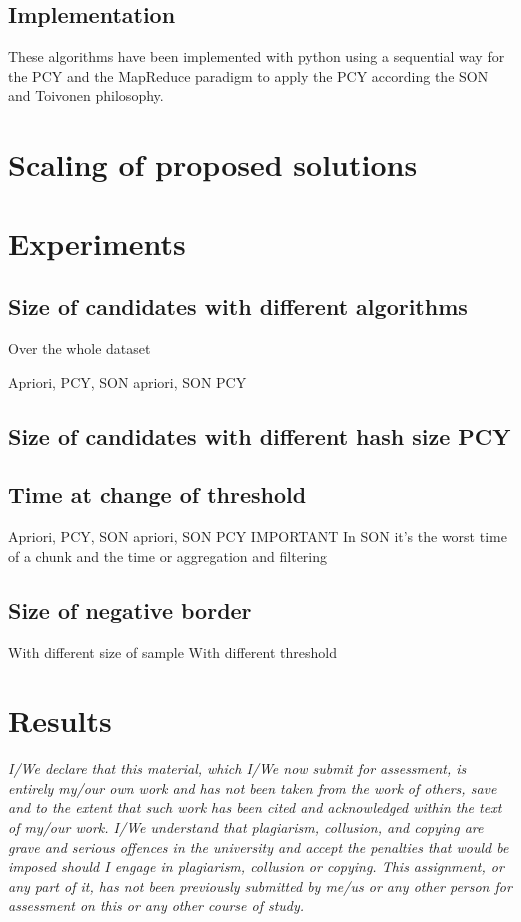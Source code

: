 \documentclass[14pt]{extarticle}
\begin{document}
\subsection{Implementation}
These algorithms have been implemented with python using a sequential way for the PCY and the MapReduce paradigm to apply the PCY according the SON and Toivonen philosophy.


\section{Scaling of proposed solutions}
\section{Experiments}
\subsection{Size of candidates with different algorithms}
Over the whole dataset

Apriori, PCY, SON apriori, SON PCY
\subsection{Size of candidates with different hash size PCY}
\subsection{Time at change of threshold}
Apriori, PCY, SON apriori, SON PCY
IMPORTANT
In SON it's the worst time of a chunk and the time or aggregation and filtering
\subsection{Size of negative border}
With different size of sample
With different threshold
\section{Results}
{\it I/We declare that this material, which I/We now submit for assessment, is entirely my/our own work and has not been taken from the work of others, save and to the extent that such work has been cited and acknowledged within the text of my/our work. I/We understand that plagiarism, collusion, and copying are grave and serious offences in the university and accept the penalties that would be imposed should I engage in plagiarism, collusion or copying. This assignment, or any part of it, has not been previously submitted by me/us or any other person for assessment on this or any other course of study.}

\begin{comment}
The report should contain the following information:

-the chosen dataset, and the parts of the latter which have been considered,
-how data have been organized,
-the applied pre-processing techniques,
-the considered algorithms and their implementations,
-how the proposed solution scales up with data size,
-a description of the experiments,
-comments and discussion on the experimental results.

\end{comment}
\end{document}
